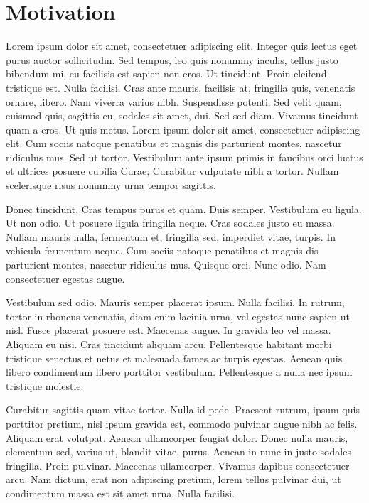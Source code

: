 \section{Motivation}
\label{ch:1}
Lorem ipsum dolor sit amet, consectetuer adipiscing elit. Integer quis lectus eget purus auctor sollicitudin. Sed tempus, leo quis nonummy iaculis, tellus justo bibendum mi, eu facilisis est sapien non eros. Ut tincidunt. Proin eleifend tristique est. Nulla facilisi. Cras ante mauris, facilisis at, fringilla quis, venenatis ornare, libero. Nam viverra varius nibh. Suspendisse potenti. Sed velit quam, euismod quis, sagittis eu, sodales sit amet, dui. Sed sed diam. Vivamus tincidunt quam a eros. Ut quis metus. Lorem ipsum dolor sit amet, consectetuer adipiscing elit. Cum sociis natoque penatibus et magnis dis parturient montes, nascetur ridiculus mus. Sed ut tortor. Vestibulum ante ipsum primis in faucibus orci luctus et ultrices posuere cubilia Curae; Curabitur vulputate nibh a tortor. Nullam scelerisque risus nonummy urna tempor sagittis.

Donec tincidunt. Cras tempus purus et quam. Duis semper. Vestibulum eu ligula. Ut non odio. Ut posuere ligula fringilla neque. Cras sodales justo eu massa. Nullam mauris nulla, fermentum et, fringilla sed, imperdiet vitae, turpis. In vehicula fermentum neque. Cum sociis natoque penatibus et magnis dis parturient montes, nascetur ridiculus mus. Quisque orci. Nunc odio. Nam consectetuer egestas augue.

Vestibulum sed odio. Mauris semper placerat ipsum. Nulla facilisi. In rutrum, tortor in rhoncus venenatis, diam enim lacinia urna, vel egestas nunc sapien ut nisl. Fusce placerat posuere est. Maecenas augue. In gravida leo vel massa. Aliquam eu nisi. Cras tincidunt aliquam arcu. Pellentesque habitant morbi tristique senectus et netus et malesuada fames ac turpis egestas. Aenean quis libero condimentum libero porttitor vestibulum. Pellentesque a nulla nec ipsum tristique molestie.

Curabitur sagittis quam vitae tortor. Nulla id pede. Praesent rutrum, ipsum quis porttitor pretium, nisl ipsum gravida est, commodo pulvinar augue nibh ac felis. Aliquam erat volutpat. Aenean ullamcorper feugiat dolor. Donec nulla mauris, elementum sed, varius ut, blandit vitae, purus. Aenean in nunc in justo sodales fringilla. Proin pulvinar. Maecenas ullamcorper. Vivamus dapibus consectetuer arcu. Nam dictum, erat non adipiscing pretium, lorem tellus pulvinar dui, ut condimentum massa est sit amet urna. Nulla facilisi.

